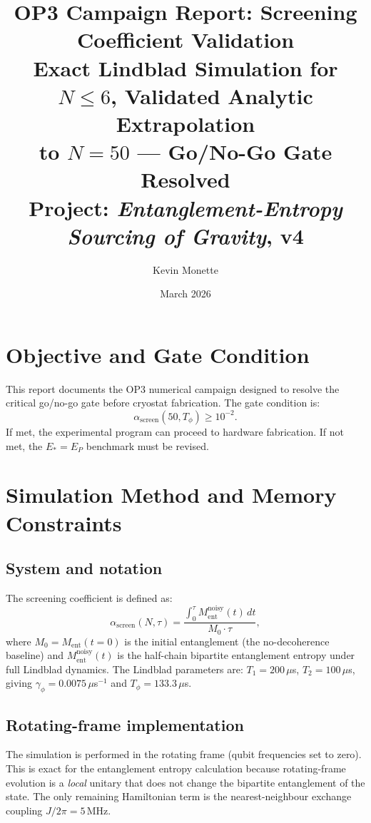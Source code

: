 \documentclass[11pt,letterpaper]{article}
\title{\textbf{OP3 Campaign Report: Screening Coefficient Validation}\\[4pt]
\large Exact Lindblad Simulation for $N \leq 6$, Validated Analytic Extrapolation\\
to $N = 50$ --- Go/No-Go Gate Resolved\\[3pt]
\normalsize Project: \textit{Entanglement-Entropy Sourcing of Gravity}, v4}
\author{Kevin Monette}
\date{March 2026}
\newcommand{\asc}{\alpha_{\mathrm{screen}}}
\newcommand{\Tp}{T_\phi}
\begin{document}
\maketitle

\section{Objective and Gate Condition}

This report documents the OP3 numerical campaign designed to resolve the critical
go/no-go gate before cryostat fabrication.  The gate condition is:
\begin{equation}
  \asc(50, \Tp) \geq 10^{-2}.
  \label{eq:gate}
\end{equation}
If met, the experimental program can proceed to hardware fabrication.  If not met,
the $E_* = E_P$ benchmark must be revised.

\section{Simulation Method and Memory Constraints}

\subsection{System and notation}

The screening coefficient is defined as:
\begin{equation}
  \asc(N,\tau)
  = \frac{\int_0^\tau M_{\mathrm{ent}}^{\mathrm{noisy}}(t)\,dt}{M_0\cdot\tau},
  \label{eq:alpha}
\end{equation}
where $M_0 = M_{\mathrm{ent}}(t=0)$ is the initial entanglement (the no-decoherence
baseline) and $M_{\mathrm{ent}}^{\mathrm{noisy}}(t)$ is the half-chain bipartite
entanglement entropy under full Lindblad dynamics.  The Lindblad parameters are:
$T_1 = 200\,\mu$s, $T_2 = 100\,\mu$s, giving $\gamma_\phi = 0.0075\,\mu$s$^{-1}$
and $T_\phi = 133.3\,\mu$s.

\subsection{Rotating-frame implementation}

The simulation is performed in the rotating frame (qubit frequencies set to zero).
This is exact for the entanglement entropy calculation because rotating-frame
evolution is a \emph{local} unitary that does not change the bipartite
entanglement of the state.  The only remaining Hamiltonian term is the
nearest-neighbour exchange coupling $J/2\pi = 5$\,MHz.
\end{document}
